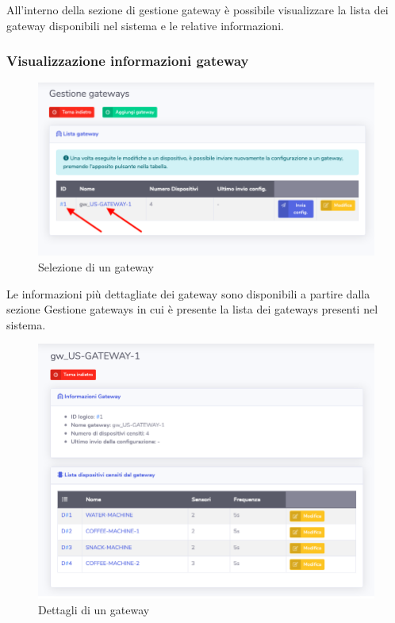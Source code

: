 		All'interno della sezione di gestione gateway è possibile visualizzare la lista dei gateway disponibili nel sistema e le relative informazioni.

	\subsubsection{Visualizzazione informazioni gateway}

		\begin{figure}[H]
		\centering
		\includegraphics[scale=0.500]{res/images/admin/selDettGateway.png}
		\caption{Selezione di un gateway}
	\end{figure}


		Le informazioni più dettagliate dei gateway sono disponibili a partire dalla sezione Gestione gateways in cui è presente la lista dei gateways presenti nel sistema.

		\begin{figure}[H]
		\centering
		\includegraphics[scale=0.500]{res/images/admin/dettGateway.png}
		\caption{Dettagli di un gateway}
	\end{figure}

